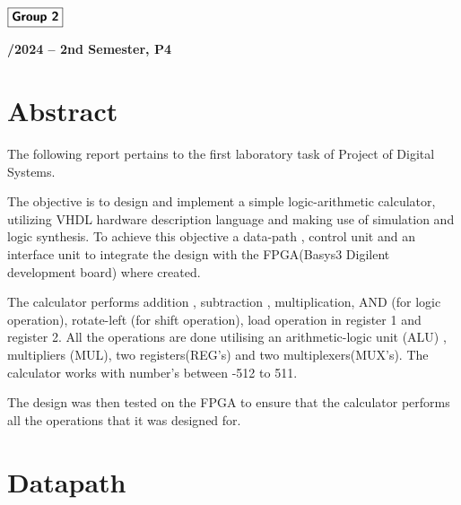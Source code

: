 \documentclass[12pt]{article}
\begin{document}
\begin{flushleft}
    \large $\boxed{\text{\bf \fontfamily{cmss}\selectfont Group 2}}$\\[4.0cm]
\end{flushleft}
    
\begin{center}
    \large \bf {}/2024 -- 2nd Semester, P4
\end{center}

\thispagestyle{empty}

\setcounter{page}{0}

\newpage

\tableofcontents 

\newpage

\section{Abstract}
The following report pertains to the first laboratory task of Project of Digital Systems.

The objective is to design and implement a simple logic-arithmetic calculator, utilizing VHDL hardware description language and making use of simulation and logic synthesis. 
To achieve this objective a data-path , control unit and an interface
unit to integrate the design with the FPGA(Basys3 Digilent development board) where created. 

The calculator performs addition , subtraction , multiplication, AND (for logic operation), rotate-left  (for shift operation), load operation in register 1 and register 2. All the operations are done utilising an arithmetic-logic unit (ALU) , multipliers (MUL), two registers(REG's) and two multiplexers(MUX's). The calculator works with number's between -512 to 511. 

The design was then tested on the FPGA to ensure that the calculator performs all the operations that it was designed for.

\section{Datapath}


\newpage
\end{document}
